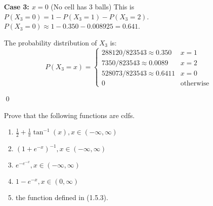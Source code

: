 \textbf{Case 3: $x=0$} (No cell has 3 balls)
This is $P(X_3=0) = 1 - P(X_3=1) - P(X_3=2)$.
$P(X_3=0) \approx 1 - 0.350 - 0.008925 = 0.641$.

The probability distribution of $X_3$ is:
\[ P(X_3=x) = \begin{cases}
    288120/823543 \approx 0.350 & x=1 \\
    7350/823543 \approx 0.0089 & x=2 \\
    528073/823543 \approx 0.6411 & x=0 \\
    0 & \text{otherwise}
\end{cases}
\]



\qed
\begin{problembox}
Prove that the following functions are cdfs.
\begin{enumerate}[label=(\alph*)]
    \item $\frac{1}{2}+\frac{1}{\pi}\tan^{-1}(x),x\in(-\infty,\infty)$
    \item $(1+e^{-x})^{-1},x\in(-\infty,\infty)$
    \item $e^{-e^{-x}},x\in(-\infty,\infty)$
    \item $1-e^{-x},x\in(0,\infty)$
    \item the function defined in (1.5.3).
\end{enumerate}
\end{problembox}

